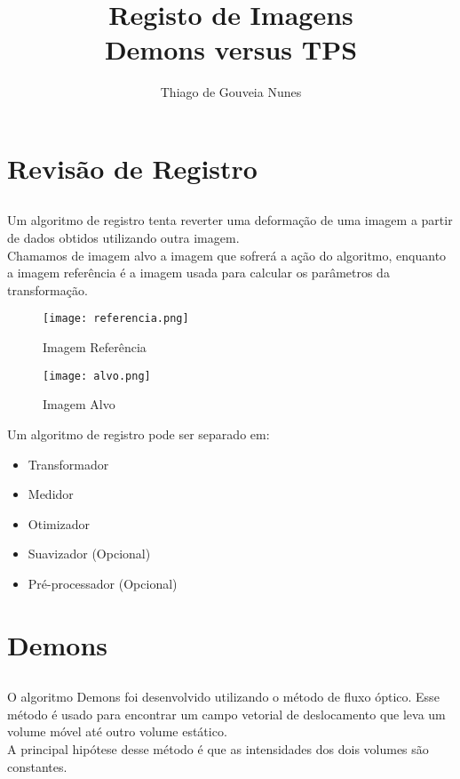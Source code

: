 \documentclass[t]{beamer}
\author{Thiago de Gouveia Nunes}
\title{Registo de Imagens\\ Demons versus TPS}
\institute{IME - USP}
\begin{document}
\graphicspath{{images/}}
\frame{\titlepage}

\section{Revisão de Registro}
\subsection{}

\begin{frame}
    Um algoritmo de registro tenta reverter uma deformação de uma imagem a partir de dados obtidos utilizando outra imagem. \\
    Chamamos de imagem alvo a imagem que sofrerá a ação do algoritmo, enquanto a imagem referência é a imagem usada para calcular os parâmetros da transformação.
\end{frame}

\begin{frame}
    \begin{figure}[p]
        \centering
        \texttt{[image: referencia.png]}
        \caption{Imagem Referência}
        \label{fig:ref}
    \end{figure}
\end{frame}

\begin{frame}
    \begin{figure}[p]
        \centering
        \texttt{[image: alvo.png]}
        \caption{Imagem Alvo}
        \label{fig:alvo}
    \end{figure}
\end{frame}

\begin{frame}
    Um algoritmo de registro pode ser separado em:
    \begin{itemize}
        \item Transformador
        \item Medidor
        \item Otimizador
        \item Suavizador (Opcional)
        \item Pré-processador (Opcional)
    \end{itemize}
\end{frame}

\section{Demons}
\subsection{}
\begin{frame}
  O algoritmo Demons foi desenvolvido utilizando o método de fluxo óptico. Esse método é usado para encontrar um campo vetorial de deslocamento que leva
  um volume móvel até outro volume estático. \\
  A principal hipótese desse método é que as intensidades dos dois volumes são constantes.
\end{frame}
\end{document}
